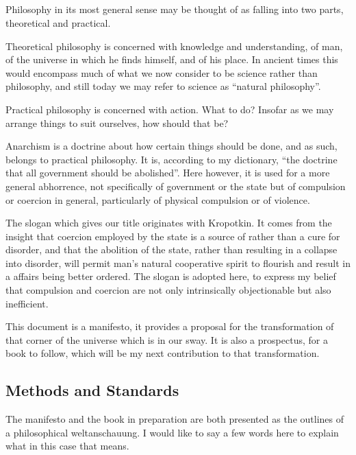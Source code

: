 \subsection{}

Philosophy in its most general sense may be thought of as falling into two parts, theoretical and practical.

Theoretical philosophy is concerned with knowledge and understanding, of man, of the universe in which he finds himself, and of his place.
In ancient times this would encompass much of what we now consider to be science rather than philosophy, and still today we may refer to science as ``natural philosophy''.

Practical philosophy is concerned with action.
What to do?
Insofar as we may arrange things to suit ourselves, how should that be?

Anarchism is a doctrine about how certain things should be done, and as such, belongs to practical philosophy.
It is, according to my dictionary, ``the doctrine that all government should be abolished''.
Here however, it is used for a more general abhorrence, not specifically of government or the state but of compulsion or coercion in general, particularly of physical compulsion or of violence.

The slogan which gives our title originates with Kropotkin.
It comes from the insight that coercion employed by the state is a source of rather than a cure for disorder, and that the abolition of the state, rather than resulting in a collapse into disorder, will permit man's natural cooperative spirit to flourish and result in a affairs being better ordered.
The slogan is adopted here, to express my belief that compulsion and coercion are not only intrinsically objectionable but also inefficient.

This document is a manifesto, it provides a proposal for the transformation of that corner of the universe which is in our sway.
It is also a prospectus, for a book to follow, which will be my next contribution to that transformation.

\subsection{Methods and Standards}

The manifesto and the book in preparation are both presented as the outlines of a philosophical weltanschauung.
I would like to say a few words here to explain what in this case that means.

